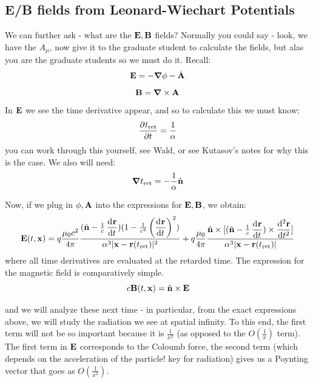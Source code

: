 \subsection{E/B fields from Leonard-Wiechart Potentials}

We can further ask - what are the $\mathbf{E}, \mathbf{B}$ fields? Normally you could say - look, we have the $A_\mu$, now give it to the graduate student to calculate the fields, but alas you are the graduate students so we must do it. Recall:
\begin{equation}
    \v{E} = -\nabla \phi - \dot{\v{A}}
\end{equation}
\begin{equation}
    \v{B} = \nabla \times \v{A}
\end{equation}
In $\mathbf{E}$ we see the time derivative appear, and so to calculate this we must know:
\begin{equation}
    \dpd{t_{\text{ret}}}{t} = \frac{1}{\alpha}
\end{equation}
you can work through this yourself, see Wald, or see Kutasov's notes for why this is the case. We also will need:
\begin{equation}
    \nabla t_{\text{ret}} = -\frac{1}{\alpha}\hat{\v{n}}
\end{equation}

Now, if we plug in $\phi, \mathbf{A}$ into the expressions for $\mathbf{E}, \mathbf{B}$, we obtain:
\begin{equation}
    \v{E}(t, \v{x}) = q\frac{\mu_0 c^2}{4\pi}\frac{(\hat{\v{n}} - \frac{1}{c}\dod{\v{r}}{t})(1 - \frac{1}{c^2}\left(\dod{\v{r}}{t}\right)^2)}{\alpha^3\abs{\v{x} - \v{r}(t_{\text{ret}})}^2} + q\frac{\mu_0}{4\pi}\frac{\hat{\v{n}} \times [(\hat{\v{n}} - \frac{1}{c}\dod{\v{r}}{t})\times \dod[2]{\v{r}}{t}]}{\alpha^3\abs{\v{x} - \v{r}(t_{\text{ret}})}}
\end{equation}
where all time derivatives are evaluated at the retarded time. The expression for the magnetic field is comparatively simple.
\begin{equation}
   c \mathbf{B}(t, \mathbf{x}) = \hat{\mathbf{n}} \times \mathbf{E}
\end{equation}

and we will analyze these next time - in particular, from the exact expressions above, we will study the radiation we see at spatial infinity. To this end, the first term will not be so important because it is $\frac{1}{x^2}$ (as opposed to the $O(\frac{1}{x})$ term). The first term in $\mathbf{E}$ corresponds to the Coloumb force, the second term (which depends on the acceleration of the particle! key for radiation) gives us a Poynting vector that goes as $O(\frac{1}{x^2})$.
